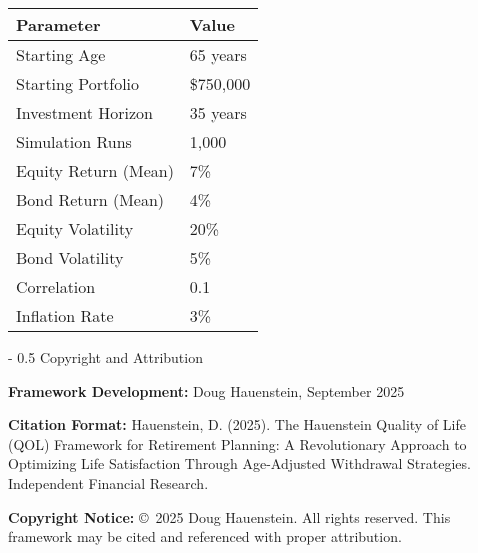 \documentclass[12pt,a4paper]{article}
\makeatletter
\renewcommand{\section}{\@startsection{section}{1}{0mm}%
                                {-\baselineskip}%
                                {0.5\baselineskip}%
                                {\normalfont\Large\bfseries}}
\makeatother
\begin{document}
\begin{center}
\begin{tabular}{ll}
\hline
\textbf{Parameter} & \textbf{Value} \\
\hline
Starting Age & 65 years \\
Starting Portfolio & \$750,000 \\
Investment Horizon & 35 years \\
Simulation Runs & 1,000 \\
Equity Return (Mean) & 7\% \\
Bond Return (Mean) & 4\% \\
Equity Volatility & 20\% \\
Bond Volatility & 5\% \\
Correlation & 0.1 \\
Inflation Rate & 3\% \\
\hline
\end{tabular}
\end{center}

\section{Copyright and Attribution}

\textbf{Framework Development:} Doug Hauenstein, September 2025

\textbf{Citation Format:} Hauenstein, D. (2025). The Hauenstein Quality of Life (QOL) Framework for Retirement Planning: A Revolutionary Approach to Optimizing Life Satisfaction Through Age-Adjusted Withdrawal Strategies. Independent Financial Research.

\textbf{Copyright Notice:} \copyright\, 2025 Doug Hauenstein. All rights reserved. This framework may be cited and referenced with proper attribution.
\end{document}
